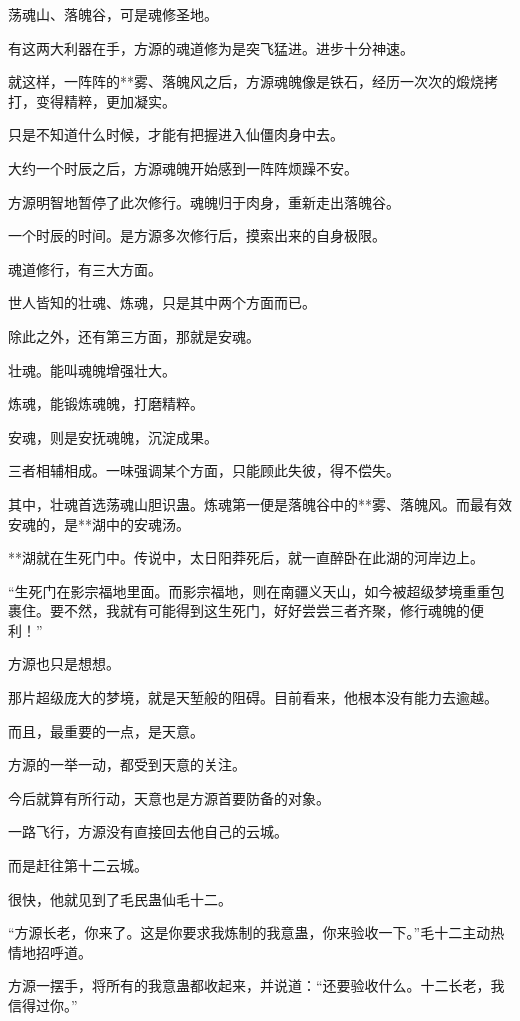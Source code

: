 \begin{this_body}
荡魂山、落魄谷，可是魂修圣地。

有这两大利器在手，方源的魂道修为是突飞猛进。进步十分神速。

就这样，一阵阵的**雾、落魄风之后，方源魂魄像是铁石，经历一次次的煅烧拷打，变得精粹，更加凝实。

只是不知道什么时候，才能有把握进入仙僵肉身中去。

大约一个时辰之后，方源魂魄开始感到一阵阵烦躁不安。

方源明智地暂停了此次修行。魂魄归于肉身，重新走出落魄谷。

一个时辰的时间。是方源多次修行后，摸索出来的自身极限。

魂道修行，有三大方面。

世人皆知的壮魂、炼魂，只是其中两个方面而已。

除此之外，还有第三方面，那就是安魂。

壮魂。能叫魂魄增强壮大。

炼魂，能锻炼魂魄，打磨精粹。

安魂，则是安抚魂魄，沉淀成果。

三者相辅相成。一味强调某个方面，只能顾此失彼，得不偿失。

其中，壮魂首选荡魂山胆识蛊。炼魂第一便是落魄谷中的**雾、落魄风。而最有效安魂的，是**湖中的安魂汤。

**湖就在生死门中。传说中，太日阳莽死后，就一直醉卧在此湖的河岸边上。

“生死门在影宗福地里面。而影宗福地，则在南疆义天山，如今被超级梦境重重包裹住。要不然，我就有可能得到这生死门，好好尝尝三者齐聚，修行魂魄的便利！”

方源也只是想想。

那片超级庞大的梦境，就是天堑般的阻碍。目前看来，他根本没有能力去逾越。

而且，最重要的一点，是天意。

方源的一举一动，都受到天意的关注。

今后就算有所行动，天意也是方源首要防备的对象。

一路飞行，方源没有直接回去他自己的云城。

而是赶往第十二云城。

很快，他就见到了毛民蛊仙毛十二。

“方源长老，你来了。这是你要求我炼制的我意蛊，你来验收一下。”毛十二主动热情地招呼道。

方源一摆手，将所有的我意蛊都收起来，并说道：“还要验收什么。十二长老，我信得过你。”


\end{this_body}
